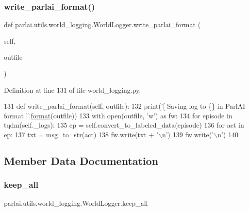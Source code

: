 \subsubsection{\texorpdfstring{write\+\_\+parlai\+\_\+format()}{write\_parlai\_format()}}
{\footnotesize\ttfamily def parlai.\+utils.\+world\+\_\+logging.\+World\+Logger.\+write\+\_\+parlai\+\_\+format (\begin{DoxyParamCaption}\item[{}]{self,  }\item[{}]{outfile }\end{DoxyParamCaption})}



Definition at line 131 of file world\+\_\+logging.\+py.


\begin{DoxyCode}
131     \textcolor{keyword}{def }write\_parlai\_format(self, outfile):
132         print(\textcolor{stringliteral}{'[ Saving log to \{\} in ParlAI format ]'}.\hyperlink{namespaceparlai_1_1chat__service_1_1services_1_1messenger_1_1shared__utils_a32e2e2022b824fbaf80c747160b52a76}{format}(outfile))
133         with open(outfile, \textcolor{stringliteral}{'w'}) \textcolor{keyword}{as} fw:
134             \textcolor{keywordflow}{for} episode \textcolor{keywordflow}{in} tqdm(self.\_logs):
135                 ep = self.convert\_to\_labeled\_data(episode)
136                 \textcolor{keywordflow}{for} act \textcolor{keywordflow}{in} ep:
137                     txt = \hyperlink{namespaceparlai_1_1utils_1_1misc_ae5db473b41d3b49814e2566e866282b6}{msg\_to\_str}(act)
138                     fw.write(txt + \textcolor{stringliteral}{'\(\backslash\)n'})
139                 fw.write(\textcolor{stringliteral}{'\(\backslash\)n'})
140 
\end{DoxyCode}


\subsection{Member Data Documentation}
\mbox{\label{classparlai_1_1utils_1_1world__logging_1_1WorldLogger_aa183aa6d24db81a89a4b21f54d374ef2}} 
\subsubsection{\texorpdfstring{keep\+\_\+all}{keep\_all}}
{\footnotesize\ttfamily parlai.\+utils.\+world\+\_\+logging.\+World\+Logger.\+keep\+\_\+all}



